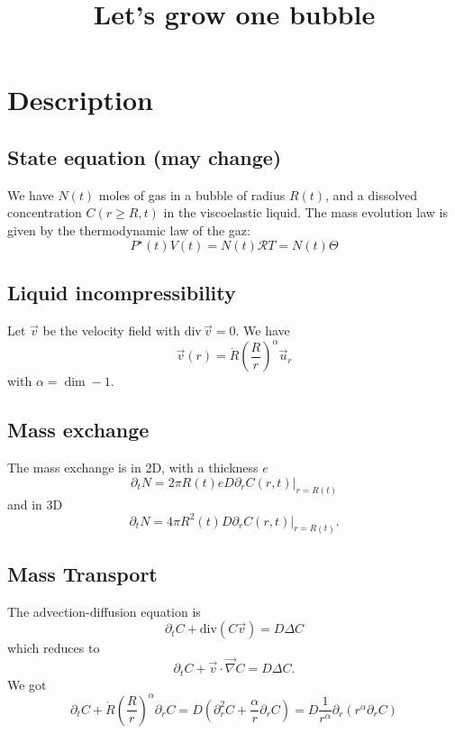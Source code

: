\documentclass[11pt]{revtex4}
\begin{document}
\title{Let's grow one bubble}

\maketitle

\section{Description}

\subsection{State equation (may change)}
We have $N(t)$ moles of gas in a bubble of radius $R(t)$, and
a dissolved concentration $C(r\geq R,t)$ in the viscoelastic liquid.
The mass evolution law is given by the thermodynamic law of the gaz:
\begin{equation}
	\label{eq:evolve}
	P^\star(t) V(t) = N(t) \mathcal{R}T = N(t) \Theta
\end{equation}

\subsection{Liquid incompressibility}
Let $\vec{v}$ be the velocity field with $\mathrm{div}\,\vec{v}=0$.
We have \begin{equation}
	\label{eq:v2d}
	\vec{v}(r) = \dot{R} \left(\dfrac{R}{r}\right)^\alpha \vec{u}_{r}
\end{equation}
with $\alpha=\dim-1$.

\subsection{Mass exchange}
The mass exchange is in 2D, with a thickness $e$
\begin{equation}
	\label{eq:xch2d}
	\partial_t N = 2\pi R(t) e D \partial_r C(r,t)\vert_{r=R(t)}
\end{equation}
and in 3D
\begin{equation}
	\label{eq:xch3d}
	\partial_t N = 4\pi R^2(t) D \partial_r C(r,t)\vert_{r=R(t)}.
\end{equation}

\subsection{Mass Transport}
The advection-diffusion equation is
\begin{equation}
	\label{eq:transport0}
	\partial_t C + \mathrm{div}(C\vec{v}) = D \Delta C
\end{equation}
which reduces to
\begin{equation}
	\label{eq:transport}
	\partial_t C + \vec{v}\cdot\vec{\nabla}C = D \Delta C.
\end{equation}
We got
\begin{equation}
\label{eq:transport}
\partial_t C + \dot{R} \left(\dfrac{R}{r}\right)^\alpha \partial_r C 
=  D \left(\partial_r^2 C + \dfrac{\alpha}{r} \partial_r C  \right) 
=  D \dfrac{1}{r^\alpha} \partial_r \left(r^\alpha \partial_r C \right)
\end{equation}
\end{document}
